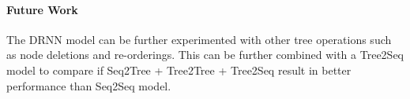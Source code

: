 \documentclass[11pt,a4paper]{article}
\begin{document}
\paragraph{Future Work}
The DRNN model can be further experimented with other tree operations such as node deletions and re-orderings. This can be further combined with a Tree2Seq model to compare if Seq2Tree + Tree2Tree +  Tree2Seq result in better performance than Seq2Seq model.






\end{document}
